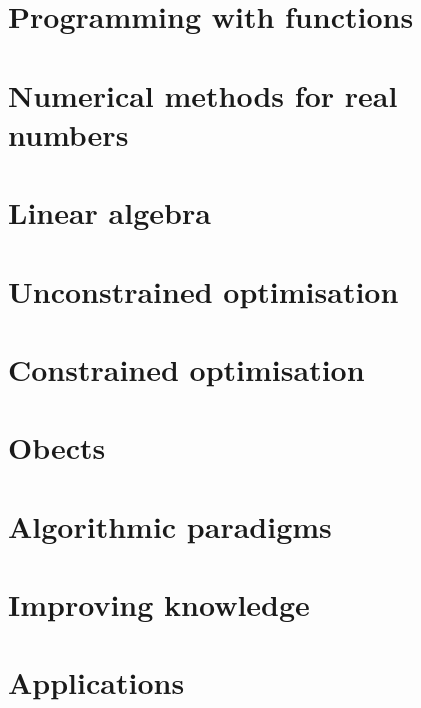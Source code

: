 \documentclass[oneside]{book}
\begin{document}
\part{Programming with functions}





\part{Numerical methods for real numbers}
















\part{Linear algebra}



\part{Unconstrained optimisation}





\part{Constrained optimisation}


\part{Obects}








\part{Algorithmic paradigms}




\part{Improving knowledge}



\part{Applications}




\end{document}
